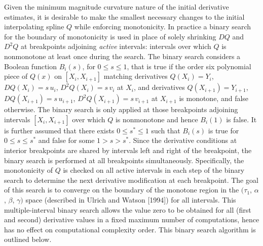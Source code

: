 Given the minimum magnitude curvature nature of the initial derivative
estimates, it is desirable to make the smallest necessary changes to
the initial interpolating spline $Q$ while enforcing monotonicity. In
practice a binary search for the boundary of monotonicity is used in
place of solely shrinking $DQ$ and $D^2Q$ at breakpoints adjoining
{\it active\/} intervals: intervals over which $Q$ is nonmonotone at
least once during the search. The binary search considers a Boolean
function $B_i(s)$, for $0 \le s \le 1$, that is true if the order six
polynomial piece of $Q(x)$ on $[X_i, X_{i+1}]$ matching derivatives
$Q(X_i)=Y_i$, $DQ(X_i)=s \,u_i$, $D^2Q(X_i)=s \,v_i$ at $X_i$, and 
derivatives $Q(X_{i+1})=Y_{i+1}$, $DQ(X_{i+1})=s \,u_{i+1}$, 
$D^2Q(X_{i+1})=s \,v_{i+1}$ at $X_{i+1}$ is monotone, and false otherwise. 
The binary search is only applied at those breakpoints adjoining intervals
$[X_i, X_{i+1}]$ over which $Q$ is nonmonotone and hence $B_i(1)$ is false.
It is further assumed that there exists $0 \le s^* \le 1$ such that $B_i(s)$
is true for $0 \le s \le s^*$ and false for some $1 > s > s^*$. Since the
derivative conditions at interior breakpoints are shared by intervals left
and right of the breakpoint, the binary search is performed at all
breakpoints simultaneously.  Specifically, the monotonicity of $Q$ is
checked on all active intervals in each step of the binary search to
determine the next derivative modification at each breakpoint. The goal
of this search is to converge on the boundary of the monotone region in
the $(\tau_1$, $\alpha$, $\beta$, $\gamma)$ space (described in Ulrich and
Watson [1994]) for all intervals. This multiple-interval binary search
allows the value zero to be obtained for all (first and second) derivative
values in a fixed maximum number of computations, hence has no effect on
computational complexity order. This binary search algorithm is outlined
below.


